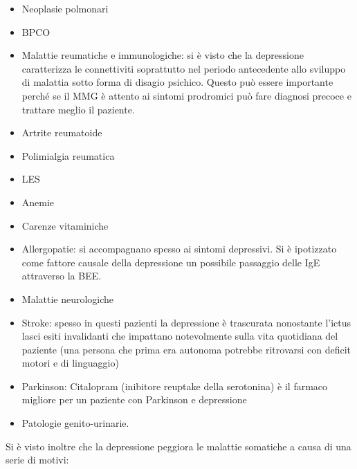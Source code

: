 \documentclass[]{article}
\begin{document}
\begin{itemize}
\item
  Neoplasie polmonari
\item
  BPCO
\end{itemize}

\begin{itemize}
\item
  Malattie reumatiche e immunologiche: si è visto che la depressione
  caratterizza le connettiviti soprattutto nel periodo antecedente allo
  sviluppo di malattia sotto forma di disagio psichico. Questo può
  essere importante perché se il MMG è attento ai sintomi prodromici può
  fare diagnosi precoce e trattare meglio il paziente.
\end{itemize}

\begin{itemize}
\item
  Artrite reumatoide
\item
  Polimialgia reumatica
\item
  LES
\end{itemize}

\begin{itemize}
\item
  Anemie
\item
  Carenze vitaminiche
\item
  Allergopatie: si accompagnano spesso ai sintomi depressivi. Si è
  ipotizzato come fattore causale della depressione un possibile
  passaggio delle IgE attraverso la BEE.
\item
  Malattie neurologiche
\end{itemize}

\begin{itemize}
\item
  Stroke: spesso in questi pazienti la depressione è trascurata
  nonostante l'ictus lasci esiti invalidanti che impattano notevolmente
  sulla vita quotidiana del paziente (una persona che prima era autonoma
  potrebbe ritrovarsi con deficit motori e di linguaggio)
\item
  Parkinson: Citalopram (inibitore reuptake della serotonina) è il
  farmaco migliore per un paziente con Parkinson e depressione
\end{itemize}

\begin{itemize}
\item
  Patologie genito-urinarie.
\end{itemize}

Si è visto inoltre che la depressione peggiora le malattie somatiche a
causa di una serie di motivi:
\end{document}
